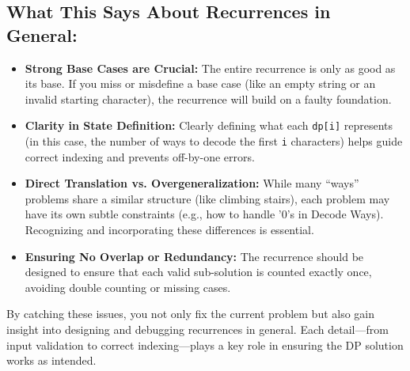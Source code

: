 \documentclass[12pt]{article}
\begin{document}
\subsection*{What This Says About Recurrences in General:}
\begin{itemize}[leftmargin=*, label={--}]
    \item \textbf{Strong Base Cases are Crucial:} The entire recurrence is only as good as its base. If you miss or misdefine a base case (like an empty string or an invalid starting character), the recurrence will build on a faulty foundation.
    \item \textbf{Clarity in State Definition:} Clearly defining what each \texttt{dp[i]} represents (in this case, the number of ways to decode the first \texttt{i} characters) helps guide correct indexing and prevents off-by-one errors.
    \item \textbf{Direct Translation vs. Overgeneralization:} While many ``ways'' problems share a similar structure (like climbing stairs), each problem may have its own subtle constraints (e.g., how to handle '0's in Decode Ways). Recognizing and incorporating these differences is essential.
    \item \textbf{Ensuring No Overlap or Redundancy:} The recurrence should be designed to ensure that each valid sub-solution is counted exactly once, avoiding double counting or missing cases.
\end{itemize}

By catching these issues, you not only fix the current problem but also gain insight into designing and debugging recurrences in general. Each detail---from input validation to correct indexing---plays a key role in ensuring the DP solution works as intended.
\end{document}

